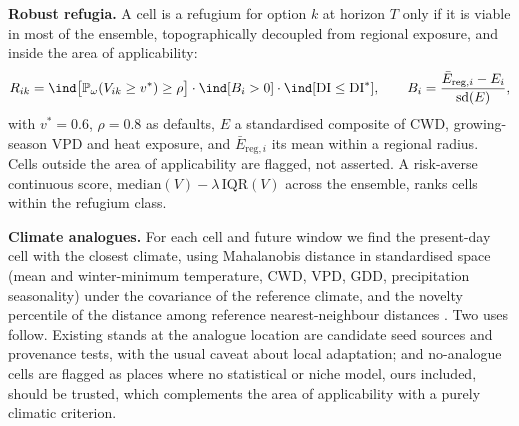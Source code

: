 \textbf{Robust refugia.} A cell is a refugium for option $k$ at horizon $T$ only if it is viable in most of the ensemble, topographically decoupled from regional exposure, and inside the area of applicability:
\begin{equation}\label{eq:refug}
R_{ik}=\ind\big[\Prob_\omega(V_{ik}\ge v^\ast)\ge\rho\big]\cdot\ind[B_i>0]\cdot\ind[\DI\le\DI^\ast],\qquad B_i=\frac{\bar E_{\text{reg},i}-E_i}{\mathrm{sd}(E)},
\end{equation}
with $v^\ast=0.6$, $\rho=0.8$ as defaults, $E$ a standardised composite of CWD, growing-season VPD and heat exposure, and $\bar E_{\text{reg},i}$ its mean within a regional radius. Cells outside the area of applicability are flagged, not asserted. A risk-averse continuous score, $\mathrm{median}(V)-\lambda\,\mathrm{IQR}(V)$ across the ensemble, ranks cells within the refugium class.

\textbf{Climate analogues.} For each cell and future window we find the present-day cell with the closest climate, using Mahalanobis distance in standardised space (mean and winter-minimum temperature, CWD, VPD, GDD, precipitation seasonality) under the covariance of the reference climate, and the novelty percentile of the distance among reference nearest-neighbour distances \citep{Mahony2017}. Two uses follow. Existing stands at the analogue location are candidate seed sources and provenance tests, with the usual caveat about local adaptation; and no-analogue cells are flagged as places where no statistical or niche model, ours included, should be trusted, which complements the area of applicability with a purely climatic criterion.
